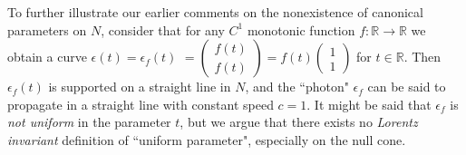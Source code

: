 \documentclass[12pt]{article}
\newcommand{\bR}{\mathbb{R}}
\newcommand{\del}{\partial}
\begin{document}
To further illustrate our earlier comments on the nonexistence of canonical parameters on $N$, consider that for any $C^1$ monotonic function $f: \bR \to \bR$ we obtain a curve $\epsilon(t)=\epsilon_f(t)$ $=\begin{pmatrix} f(t) \\ f(t)   \end{pmatrix}=f(t) \begin{pmatrix} 1 \\ 1 \end{pmatrix}$ for $t\in \bR$. Then $\epsilon_f(t)$ is supported on a straight line in $N$, and the ``photon" $\epsilon_f$ can be said to propagate in a straight line with constant speed $c=1$. It might be said that $\epsilon_f$ is \emph{not uniform} in the parameter $t$, but we argue that there exists no \emph{Lorentz invariant} definition of ``uniform parameter", especially on the null cone. 





\end{document}
